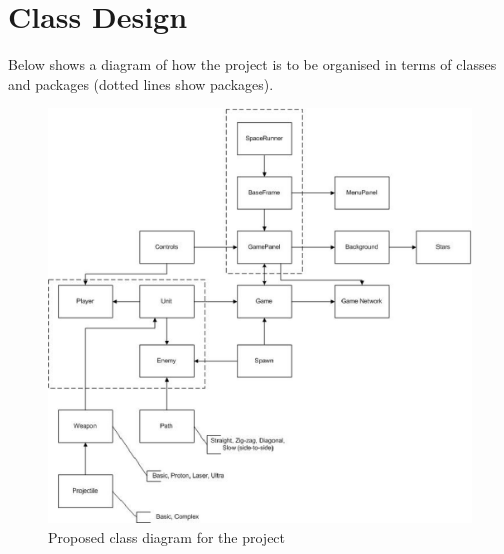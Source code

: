 \section{Class Design}
\label{sec: class_design}
Below shows a diagram of how the project is to be organised in terms of classes and packages (dotted lines show packages).
\begin{figure}
 \centering
 \includegraphics[width=15cm]{class_diagram.eps}
 \caption{Proposed class diagram for the project}
 \label{fig: class_diagram}
\end{figure}